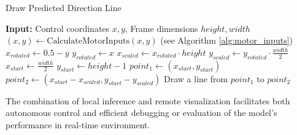 \begin{algorithm}[H]
  \caption{Draw Predicted Direction Line}
  \begin{algorithmic}[1]
    \State \textbf{Input:} Control coordinates $x, y$, Frame dimensions $height, width$
    \State $(x, y) \gets \text{CalculateMotorInputs}(x, y)$ (see Algorithm \ref{alg:motor_inputs})
    \State $x_{rotated} \gets 0.5 - y$
    \State $y_{rotated} \gets x$
    \State $x_{scaled} \gets x_{rotated} \cdot height$
    \State $y_{scaled} \gets y_{rotated} \cdot \frac{width}{2}$
    \State $x_{start} \gets \frac{width}{2}$
    \State $y_{start} \gets height - 1$
    \State $point_1 \gets (x_{start}, y_{start})$
    \State $point_2 \gets (x_{start} - x_{scaled}, y_{start} - y_{scaled})$
    \State Draw a line from $point_1$ to $point_2$
  \end{algorithmic}
  \label{alg:draw_line}
\end{algorithm}

The combination of local inference and remote visualization facilitates both autonomous control and efficient debugging or evaluation of the model's performance in real-time environment.